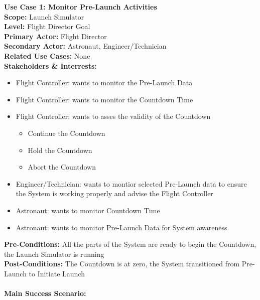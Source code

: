 \documentclass[letterpaper]{article}
\begin{document}
\noindent
\textbf{Use Case 1:  Monitor Pre-Launch Activities}\\
\textbf{Scope:  }Launch Simulator\\
\textbf{Level:  }Flight Director Goal\\
\textbf{Primary Actor:  }Flight Director\\
\textbf{Secondary Actor:  }Astronaut, Engineer/Technician\\
\textbf{Related Use Cases:  }None\\
\textbf{Stakeholders \& Interrests:  }
\begin{itemize}
\item Flight Controller:  wants to monitor the Pre-Launch Data
\item Flight Controller:  wants to monitor the Countdown Time
\item Flight Controller:  wants to asses the validity of the Countdown
\begin{itemize}
\item Continue the Countdown
\item Hold the Countdown
\item Abort the Countdown
\end{itemize}
\item Engineer/Technician:  wants to montior selected Pre-Launch data
to ensure the System is working properly and advise the Flight
Controller
\item Astronaut:  wants to monitor Countdown Time
\item Astronaut:  wants to monitor Pre-Launch Data for System
awareness
\end{itemize}
\textbf{Pre-Conditions:  }All the parts of the System are ready to
begin the Countdown, the Launch Simulator is running\\
\textbf{Post-Conditions:  }The Countdown is at zero, the System
transitioned from Pre-Launch to Initiate Launch\\\\
\textbf{Main Success Scenario:  }\\
\end{document}
